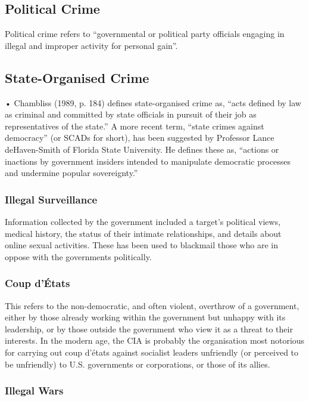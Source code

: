 \documentclass{article}
\begin{document}
\subsection{Political Crime}

Political crime refers to “governmental or political party officials engaging in illegal and improper activity for personal gain”.

\subsection{State-Organised Crime}

• Chambliss (1989, p. 184) defines state-organised crime as, “acts defined by law as criminal and committed by state officials in pursuit of their job as representatives of the state.” A more recent term, “state crimes against democracy” (or SCADs for short), has been suggested by Professor Lance deHaven-Smith of Florida State University. He defines these as, “actions or inactions by government insiders intended to manipulate democratic processes and undermine popular sovereignty.”

\subsubsection*{Illegal Surveillance}

Information collected by the government included a target’s political views, medical history, the status of their intimate relationships, and details about online sexual activities. These has been used to blackmail those who are in oppose with the governments politically.

\subsubsection*{Coup d’États}

This refers to the non-democratic, and often violent, overthrow of a government, either by those already working within the government but unhappy with its leadership, or by those outside the government who view it as a threat to their interests. In the modern age, the CIA is probably the organisation most notorious for carrying out coup d’états against socialist leaders unfriendly (or perceived to be unfriendly) to U.S. governments or corporations, or those of its allies.

\subsubsection*{Illegal Wars}
\end{document}
